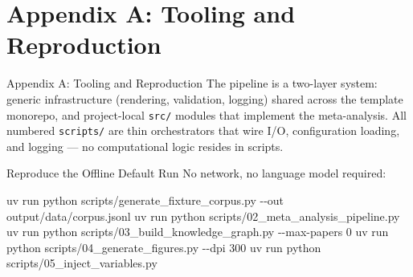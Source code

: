 \documentclass[
  ignorenonframetext,
]{beamer}
\author{}
\date{}
\newenvironment{Shaded}{}{}
\newcommand{\AttributeTok}[1]{\textcolor[rgb]{0.49,0.56,0.16}{#1}}
\newcommand{\ExtensionTok}[1]{#1}
\newcommand{\NormalTok}[1]{#1}
\begin{document}
\section{Appendix A: Tooling and
Reproduction}\label{appendix-a-tooling-and-reproduction}

\begin{frame}{Appendix A: Tooling and
Reproduction}
The pipeline is a two-layer system: generic infrastructure (rendering,
validation, logging) shared across the template monorepo, and
project-local \texttt{src/} modules that implement the meta-analysis.
All numbered \texttt{scripts/} are thin orchestrators that wire I/O,
configuration loading, and logging --- no computational logic resides in
scripts.
\end{frame}

\begin{frame}{Reproduce the Offline Default
Run}
\label{reproduce-the-offline-default-run}
No network, no language model required:

\begin{Shaded}
\begin{Highlighting}[]
\ExtensionTok{uv}\NormalTok{ run python scripts/generate\_fixture\_corpus.py }\AttributeTok{{-}{-}out}\NormalTok{ output/data/corpus.jsonl}
\ExtensionTok{uv}\NormalTok{ run python scripts/02\_meta\_analysis\_pipeline.py}
\ExtensionTok{uv}\NormalTok{ run python scripts/03\_build\_knowledge\_graph.py }\AttributeTok{{-}{-}max{-}papers}\NormalTok{ 0}
\ExtensionTok{uv}\NormalTok{ run python scripts/04\_generate\_figures.py }\AttributeTok{{-}{-}dpi}\NormalTok{ 300}
\ExtensionTok{uv}\NormalTok{ run python scripts/05\_inject\_variables.py}
\end{Highlighting}
\end{Shaded}
\end{frame}
\end{document}
